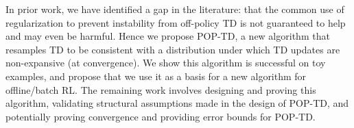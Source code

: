 \documentclass[11pt]{book}
\begin{document}
In prior work, we have identified a gap in the literature: that the common use of regularization to prevent instability from off-policy TD is not guaranteed to help and may even be harmful. Hence we propose POP-TD, a new algorithm that resamples TD to be consistent with a distribution under which TD updates are non-expansive (at convergence). We show this algorithm is successful on toy examples, and propose that we use it as a basis for a new algorithm for offline/batch RL. The remaining work involves designing and proving this algorithm, validating structural assumptions made in the design of POP-TD, and potentially proving convergence and providing error bounds for POP-TD.


\backmatter
\printbibliography

\appendix
\end{document}
